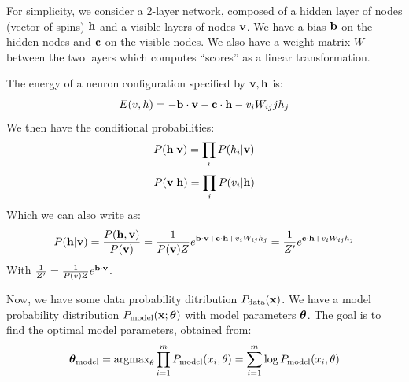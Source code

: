 For simplicity, we consider a 2-layer network, composed of a hidden layer of nodes (vector of spins) $\mathbf{h}$ and a visible layers of nodes $\mathbf{v}$. We have a bias $\mathbf{b}$ on the hidden nodes and $\mathbf{c}$ on the visible nodes. We also have a weight-matrix $W$ between the two layers which computes ``scores'' as a linear transformation.

The energy of a neuron configuration specified by $\mathbf{v}, \mathbf{h}$ is:
\begin{equation}
    E(v, h) = -\mathbf{b} \cdot \mathbf{v} - \mathbf{c} \cdot \mathbf{h} - v_iW_{ij}jh_j
\end{equation}
We then have the conditional probabilities:
\begin{equation}
    P(\mathbf{h} \vert \mathbf{v}) = \prod_i P(h_i \vert \mathbf{v})
\end{equation}
\begin{equation}
    P(\mathbf{v} \vert \mathbf{h}) = \prod_i P(v_i \vert \mathbf{h})
\end{equation}
Which we can also write as:
\begin{equation}
    P(\mathbf{h} \vert \mathbf{v}) = \frac{P(\mathbf{h}, \mathbf{v})}{P(\mathbf{v})} = \frac{1}{P(\mathbf{v})Z}e^{\mathbf{b} \cdot \mathbf{v} + \mathbf{c} \cdot \mathbf{h} + v_iW_{ij}h_j} = \frac{1}{Z'}e^{\mathbf{c} \cdot \mathbf{h} + v_iW_{ij}h_j}
\end{equation}
With $\frac{1}{Z'} = \frac{1}{P(v)Z}e^{\mathbf{b} \cdot \mathbf{v}}$. 

Now, we have some data probability ditribution $P_{\text{data}}(\mathbf{x})$. We have a model probability distribution $P_{\text{model}}(\mathbf{x};\mbox{\boldmath$ \theta $})$ with model parameters $\mbox{\boldmath$ \theta $}$. The goal is to find the optimal model parameters, obtained from:
\begin{equation}
    \mbox{\boldmath$ \theta $}_{\text{model}} = \text{argmax}_{\theta}\prod_{i=1}^m P_{\text{model}}(x_i, \theta) = \sum_{i=1}^m \log P_{\text{model}}(x_i, \theta)
\end{equation}